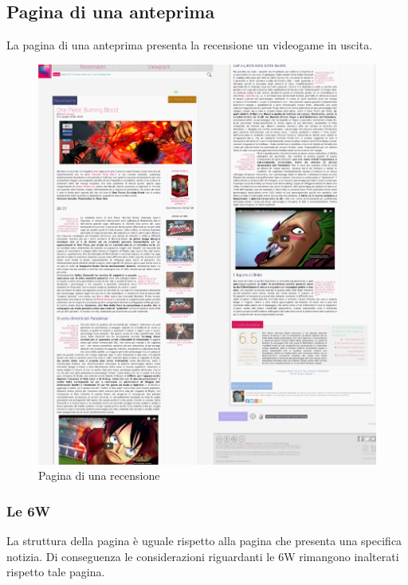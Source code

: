 \documentclass[../ProgettoTecWeb2.tex]{subfiles}
\begin{document}
	\subsection{Pagina di una anteprima}
	La pagina di una anteprima presenta la recensione un videogame in uscita.
	\begin{figure} [H]
			\centering
			\includegraphics[scale=0.15]{img/RecensioneSingolaCompleta}
			\caption{Pagina di una recensione}
	\end{figure}
		\subsubsection{Le 6W}
		La struttura della pagina è uguale rispetto alla pagina che presenta una specifica notizia. Di conseguenza le considerazioni riguardanti le 6W rimangono inalterati rispetto tale pagina.
\end{document}
